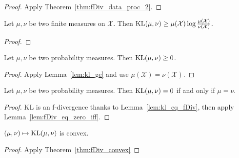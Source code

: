 \begin{proof}\mathlibok
{}
Apply Theorem~\ref{thm:fDiv_data_proc_2}.
\end{proof}


\begin{lemma}
  \label{lem:kl_ge}
  \mathlibok
  Let $\mu, \nu$ be two finite measures on $\mathcal X$. Then $\operatorname{KL}(\mu, \nu) \ge \mu(\mathcal X) \log \frac{\mu(\mathcal X)}{\nu(\mathcal X)}$.
\end{lemma}

\begin{proof}\mathlibok
{}
\end{proof}


\begin{lemma}
  \label{lem:kl_nonneg}
  \leanok
  Let $\mu, \nu$ be two probability measures. Then $\operatorname{KL}(\mu, \nu) \ge 0$.
\end{lemma}

\begin{proof}\leanok
{}
Apply Lemma~\ref{lem:kl_ge} and use $\mu(\mathcal X) = \nu (\mathcal X)$.
\end{proof}


\begin{lemma}
  \label{lem:kl_eq_zero_iff}
  \mathlibok
  Let $\mu, \nu$ be two probability measures. Then $\operatorname{KL}(\mu, \nu) = 0$ if and only if $\mu = \nu$.
\end{lemma}

\begin{proof}\mathlibok
{}
KL is an f-divergence thanks to Lemma~\ref{lem:kl_eq_fDiv}, then apply Lemma~\ref{lem:fDiv_eq_zero_iff}.
\end{proof}


\begin{lemma}
  \label{lem:kl_convex}
  $(\mu, \nu) \mapsto \operatorname{KL}(\mu, \nu)$ is convex.
\end{lemma}

\begin{proof}
Apply Theorem~\ref{thm:fDiv_convex}
\end{proof}


